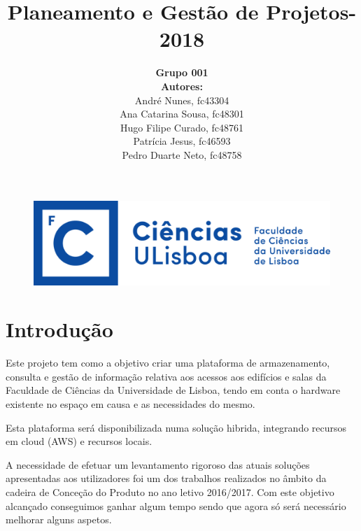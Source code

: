 \documentclass[a4paper]{report}
\begin{document}
\title{\textbf{Planeamento e Gestão de Projetos}\linebreak {}-2018\linebreak {}}
\date{}
\author{
	\textbf{Grupo 001}\\
	\textbf{Autores:}\\
	André Nunes, fc43304\\
	Ana Catarina Sousa, fc48301\\ 
	Hugo Filipe Curado, fc48761\\ 
	Patrícia Jesus, fc46593\\
	Pedro Duarte Neto, fc48758
}
\begin{figure}
	\begin{center}
		\includegraphics[scale=.2]{images/LogoFCUL.png}
	\end{center}
\end{figure}
\maketitle
\tableofcontents
\chapter{Introdução}
Este projeto tem como a objetivo criar uma plataforma de armazenamento, consulta e gestão de informação relativa aos acessos aos edifícios e salas da Faculdade de Ciências da Universidade de Lisboa, tendo em conta o hardware existente no espaço em causa e as necessidades do mesmo.

Esta plataforma será disponibilizada numa solução hibrida, integrando recursos em cloud (AWS) e recursos locais.

A necessidade de efetuar um levantamento rigoroso das atuais soluções apresentadas aos utilizadores foi um dos trabalhos realizados no âmbito da cadeira de Conceção do Produto no ano letivo 2016/2017. Com este objetivo alcançado conseguimos ganhar algum tempo sendo que agora só será necessário melhorar alguns aspetos.
\end{document}
